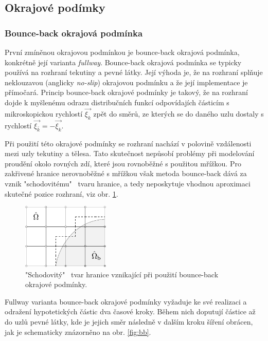 \subsection{Okrajové podímky}


\subsubsection{Bounce-back okrajová podmínka}\label{bounce-back}
První zmíněnou okrajovou podmínkou je bounce-back okrajová podmínka, konkrétně její varianta \textit{fullway}. Bounce-back okrajová podmínka se typicky používá na rozhraní tekutiny a pevné látky. Její výhoda je, že na rozhraní splňuje neklouzavou (anglicky \textit{no-slip}) okrajovou podmínku a že její implementace je přímočará. Princip bounce-back okrajové podmínky je takový, že na rozhraní dojde k myšlenému odrazu distribučních funkcí odpovídajích částicím s mikroskopickou rychlostí $ \vec{\xi_{k}} $ zpět do směrů, ze kterých se do daného uzlu dostaly s rychlostí $ \vec{\xi_{\bar{k}}} = -\vec{\xi_{k}}$.

Při použití této okrajové podmínky se rozhraní nachází v polovině vzdálenosti mezi uzly tekutiny a tělesa. Tato skutečnost nepůsobí problémy při modelování proudění okolo rovných zdí, které jsou rovnoběžné s použitou mřížkou. Pro zakřivené hranice nerovnoběžné s mřížkou však metoda bounce-back dává za vznik "schodovitému" \ tvaru hranice, a tedy neposkytuje vhodnou aproximaci skutečné pozice rozhraní, viz obr. \ref{fig:staircase}.

\begin{figure}[H]
	\centering
	\vspace{2mm}
	\includegraphics[width=0.37\textwidth]{Images/stairboundary.pdf}
	\vspace{2mm}
	\caption{"Schodovitý" \ tvar hranice vznikající při použití bounce-back okrajové podmínky.}
	\label{fig:staircase}
	\vspace{1.8mm}
\end{figure}


Fullway varianta bounce-back okrajové podmínky vyžaduje ke své realizaci a odražení hypotetických částic dva časové kroky. Během nich doputují částice až do uzlů pevné látky, kde je jejich směr následně v dalším kroku šíření obrácen, jak je schematicky znázorněno na obr. \ref{fig:bb}.


